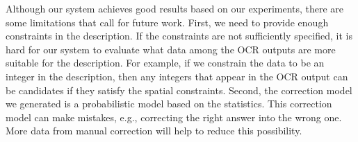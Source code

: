 Although our system achieves good results based on our 
experiments, there are some limitations that call for future 
work. First, we need to provide enough constraints in the description.
If the constraints are not 
sufficiently specified, it is hard for our system to evaluate what 
data among the OCR outputs are more suitable for the description. 
For example, if we constrain the data to be an integer in the 
description, then any integers that appear in the OCR output can be 
candidates if they satisfy the spatial constraints. 
Second, the correction model 
we generated is a probabilistic model based on the statistics. 
This correction model can make mistakes, 
e.g., correcting the right answer into the wrong one. More data 
from manual correction will help to reduce this possibility. 

